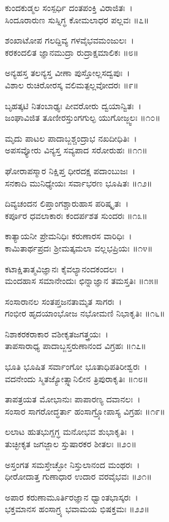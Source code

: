 	ಕುಂದಕುಡ್ಮಲ ಸಂಸ್ಪರ್ಧಿ ದಂತಪಂಕ್ತಿ ವಿರಾಜಿತಃ~।\\
	ಸಿಂದೂರಾರುಣ ಸುಸ್ನಿಗ್ಧ ಕೋಮಲಾಧರ ಪಲ್ಲವಃ ॥೭॥

ಶಂಖಾಟೋಪ ಗಲದ್ದಿವ್ಯ ಗಳವೈಭವಮಂಜುಲಃ~।\\
ಕರಕಂದಲಿತ ಜ್ಞಾನಮುದ್ರಾ ರುದ್ರಾಕ್ಷಮಾಲಿಕಃ ॥೮॥

	ಅನ್ಯಹಸ್ತ ತಲನ್ಯಸ್ತ ವೀಣಾ ಪುಸ್ತೋಲ್ಲಸದ್ವಪುಃ~।\\
	ವಿಶಾಲ ರುಚಿರೋರಸ್ಕ ವಲಿಮತ್ಪಲ್ಲವೋದರಃ ॥೯॥

ಬೃಹತ್ಕಟಿ ನಿತಂಬಾಢ್ಯಃ ಪೀವರೋರು ದ್ವಯಾನ್ವಿತಃ~।\\
ಜಂಘಾವಿಜಿತ ತೂಣೀರಸ್ತುಂಗಗುಲ್ಫ ಯುಗೋಜ್ಜ್ವಲಃ ॥೧೦॥

	ಮೃದು ಪಾಟಲ ಪಾದಾಬ್ಜಶ್ಚಂದ್ರಾಭ ನಖದೀಧಿತಿಃ~।\\
	ಅಪಸವ್ಯೋರು ವಿನ್ಯಸ್ತ ಸವ್ಯಪಾದ ಸರೋರುಹಃ ॥೧೧॥

ಘೋರಾಪಸ್ಮಾರ ನಿಕ್ಷಿಪ್ತ ಧೀರದಕ್ಷ ಪದಾಂಬುಜಃ~।\\
ಸನಕಾದಿ ಮುನಿಧ್ಯೇಯಃ ಸರ್ವಾಭರಣ ಭೂಷಿತಃ ॥೧೨॥

	ದಿವ್ಯಚಂದನ ಲಿಪ್ತಾಂಗಶ್ಚಾರುಹಾಸ ಪರಿಷ್ಕೃತಃ~।\\
	ಕರ್ಪೂರ ಧವಲಾಕಾರಃ ಕಂದರ್ಪಶತ ಸುಂದರಃ ॥೧೩॥

ಕಾತ್ಯಾಯನೀ ಪ್ರೇಮನಿಧಿಃ ಕರುಣಾರಸ ವಾರಿಧಿಃ~।\\
ಕಾಮಿತಾರ್ಥಪ್ರದಃ ಶ್ರೀಮತ್ಕಮಲಾ ವಲ್ಲಭಪ್ರಿಯಃ ॥೧೪॥

	ಕಟಾಕ್ಷಿತಾತ್ಮವಿಜ್ಞಾನಃ ಕೈವಲ್ಯಾನಂದಕಂದಲಃ~।\\
	ಮಂದಹಾಸ ಸಮಾನೇಂದುಃ ಛಿನ್ನಾಜ್ಞಾನ ತಮಸ್ತತಿಃ ॥೧೫॥

ಸಂಸಾರಾನಲ ಸಂತಪ್ತಜನತಾಮೃತ ಸಾಗರಃ~।\\
ಗಂಭೀರ ಹೃದಯಾಂಭೋಜ ನಭೋಮಣಿ ನಿಭಾಕೃತಿಃ ॥೧೬॥

	ನಿಶಾಕರಕರಾಕಾರ ವಶೀಕೃತಜಗತ್ತ್ರಯಃ~।\\
	ತಾಪಸಾರಾಧ್ಯ ಪಾದಾಬ್ಜಸ್ತರುಣಾನಂದ ವಿಗ್ರಹಃ ॥೧೭॥

ಭೂತಿ ಭೂಷಿತ ಸರ್ವಾಂಗೋ ಭೂತಾಧಿಪತಿರೀಶ್ವರಃ~।\\
ವದನೇಂದು ಸ್ಮಿತಜ್ಯೋತ್ಸ್ನಾನಿಲೀನ ತ್ರಿಪುರಾಕೃತಿಃ ॥೧೮॥

	ತಾಪತ್ರಯತ ಮೋಭಾನುಃ ಪಾಪಾರಣ್ಯ ದವಾನಲಃ~।\\
	ಸಂಸಾರ ಸಾಗರೋದ್ಧರ್ತಾ ಹಂಸಾಗ್ರ್ಯೋಪಾಸ್ಯ ವಿಗ್ರಹಃ ॥೧೯॥

ಲಲಾಟ ಹುತಭುಗ್ದಗ್ಧ ಮನೋಭವ ಶುಭಾಕೃತಿಃ~।\\
ತುಚ್ಛೀಕೃತ ಜಗಜ್ಜಾಲ ಸ್ತುಷಾರಕರ ಶೀತಲಃ ॥೨೦॥

	ಅಸ್ತಂಗತ ಸಮಸ್ತೇಚ್ಛೋ ನಿಸ್ತುಲಾನಂದ ಮಂಥರಃ~।\\
	ಧೀರೋದಾತ್ತ ಗುಣಾಧಾರ ಉದಾರ ವರವೈಭವಃ ॥೨೧॥

ಅಪಾರ ಕರುಣಾಮೂರ್ತಿರಜ್ಞಾನ ಧ್ವಾಂತಭಾಸ್ಕರಃ~।\\
ಭಕ್ತಮಾನಸ ಹಂಸಾಗ್ರ್ಯ ಭವಾಮಯ ಭಿಷಕ್ತಮಃ ॥೨೨॥

